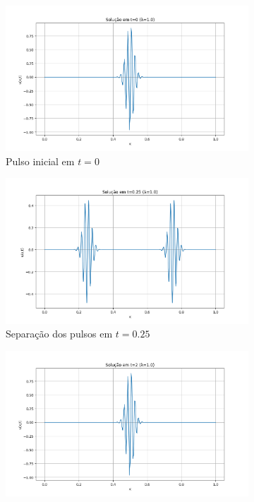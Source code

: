 \documentclass[column,amsmath,amssymb,floatfix]{revtex4}
\begin{document}
\begin{figure}[H]
 \centering
 \begin{subfigure}{0.35\textwidth}
     \includegraphics[width=\textwidth]{img/ex0301.png}
     \caption{Pulso inicial em $t=0$}
     \label{fig:ex3_1}
 \end{subfigure}
 \begin{subfigure}{0.35\textwidth}
     \includegraphics[width=\textwidth]{img/ex0302.png}
     \caption{Separação dos pulsos em $t=0.25$}
     \label{fig:ex3_2}
 \end{subfigure}
 \begin{subfigure}{0.35\textwidth}
     \includegraphics[width=\textwidth]{img/ex0303.png}

\end{subfigure}
\end{figure}
\end{document}
